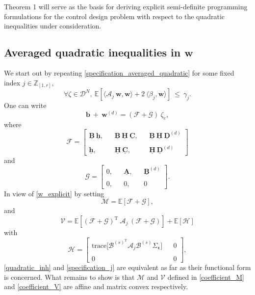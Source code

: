 \documentclass[letterpaper,11pt]{article}
\newcommand{\AR}[2]{\left[\begin{array}{#1}#2\end{array}\right]}
\newcommand{\trace}{\mathrm{trace}}
\newcommand{\T}{\mathrm{T}}
\begin{document}
\noindent Theorem 1 will serve as the basis for deriving explicit semi-definite programming formulations 
for the control design problem with respect to the quadratic inequalities under consideration. 

\subsection{Averaged quadratic inequalities in  $\mathbf{w}$ }
We start out by repeating \eqref{specification_averaged_quadratic} for some fixed index $j \in \mathbb{Z}_{[1,r]}$,
\begin{equation}
\label{specification_j}
\forall   \zeta \in \mathscr{D}^N, ~
\mathbb{E}[\langle \mathcal{A}_j ~  \mathbf{w},   \mathbf{w} \rangle + 2 ~ \langle \beta_j ,  \mathbf{w} \rangle ] ~ \leq~ \gamma_j.
\end{equation}
One can write 
$$
\bm{b}~ +~
\mathbf{w}^{(d)} =  (\mathcal{F} + \mathcal{G}) ~ \zeta_e,
$$
where
$$
\mathcal{F} = 
\AR{ccccc}{ \underline{\mathbf{B}} ~ \underline{\mathbf{h}}, & &  
	\underline{\mathbf{B}}  ~ \underline{\mathbf{H}} ~ \underline{\mathbf{C}} , & &
	\underline{\mathbf{B}}  ~ \underline{\mathbf{H}} ~ \underline{\mathbf{D}}^{(d)} \\ 
	& & & &\\
	\underline{\mathbf{h}}, & & 
	\underline{\mathbf{H}} ~ \underline{\mathbf{C}} , & &
	\underline{\mathbf{H}} ~ \underline{\mathbf{D}}^{(d)} }
$$
and
$$
\mathcal{G}  =  \AR{ccccc}{ 0, & &  
	\underline{\mathbf{A}} , & &
	\underline{\mathbf{B}}^{(d)}   \\ 
	& & & &\\
	0, & & 
	0 , & &
	0 }.
$$
In view of \eqref{w_explicit} by setting 
\begin{equation}
\label{coefficient_M}
\mathcal{M} = \mathbb{E}[\mathcal{F} + \mathcal{G}], 
\end{equation}
and 
\begin{equation}
\label{coefficient_V}
\mathcal{V} =\mathbb{E}[  (\mathcal{F} + \mathcal{G})^{\T} ~  \mathcal{A}_j~ (\mathcal{F} + \mathcal{G}) ]+ \mathbb{E}[\mathcal{H}]
\end{equation}
with 
$$
\mathcal{H} = \AR{ccc}{ \trace\bigg[ \mathcal{B}^{(s)^{\T}}   \mathcal{A}_j    \mathcal{B}^{(s)} \Sigma_{\bm{\epsilon}} \bigg]   & &  0 \\ & & \\ 0 &  & 0   },
$$
\eqref{quadratic_inh} and \eqref{specification_j} are equivalent as far as their functional form is concerned. 
What remains to show is that $ \mathcal{M} $ and $\mathcal{V}$ defined in \eqref{coefficient_M}  and \eqref{coefficient_V} are affine and matrix convex respectively.
\end{document}
